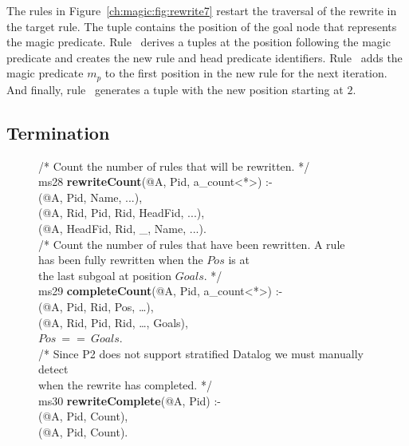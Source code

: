 The rules in Figure~\ref{ch:magic:fig:rewrite7} restart the traversal of the
rewrite in the target rule.  The  tuple contains the position of the
goal node that represents the magic predicate.  Rule~ derives a
 tuples at the position following the magic predicate and creates
the new rule and head predicate identifiers.  Rule~ adds the magic
predicate $m_p$ to the first position in the new rule for the next iteration.
And finally, rule~ generates a  tuple with the new
position starting at $2$.


\subsection{Termination}

\begin{figure}[!t]
\ssp
\centering
\begin{boxedminipage}{\linewidth}
/* Count the number of rules that will be rewritten. */ \\
ms28 {\bf rewriteCount}(@A, Pid, a\_count<*>) :- \\
(@A, Pid, Name, ...), \\
(@A, Rid, Pid, Rid, HeadFid, ...), \\
(@A, HeadFid, Rid, \_, Name, ...). \\
	
/* Count the number of rules that have been rewritten. A rule \\
has been fully rewritten when the  $Pos$ is at \\
the last subgoal at position $Goals$. */ \\
ms29 {\bf completeCount}(@A, Pid, a\_count<*>) :- \\
(@A, Pid, Rid, Pos, \ldots), \\
(@A, Rid, Pid, Rid, \ldots, Goals), \\
\datalogspace $Pos\ ==\ Goals$. \\
	
/* Since P2 does not support stratified Datalog we must manually detect  \\
when the rewrite has completed. */ \\
ms30 {\bf rewriteComplete}(@A, Pid) :-  \\
(@A, Pid, Count), \\
(@A, Pid, Count). \\


\end{boxedminipage}
\end{figure}
